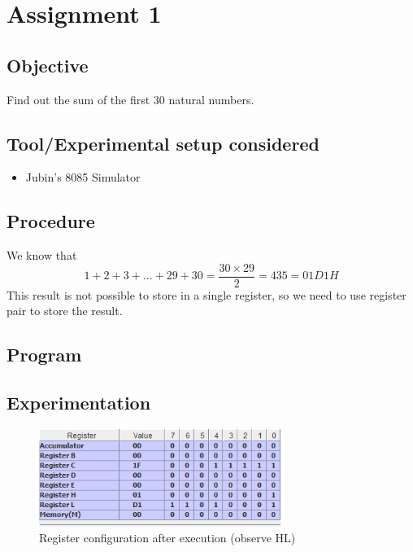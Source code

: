\documentclass[a4paper]{article} %
\begin{document}

\setcounter{tocdepth}{1} %
\tableofcontents
\newpage
{}
\setcounter{page}{1}
\section[Find out the sum of the first 30 natural numbers]{Assignment 1} %
    \subsection{Objective}
        Find out the sum of the first 30 natural numbers.
    \subsection{Tool/Experimental setup considered}
        \begin{itemize}
            \item Jubin's 8085 Simulator
        \end{itemize}
    \subsection{Procedure}
        We know that
        \[1 + 2 + 3 + ... + 29 + 30 = \frac{30 \times 29}{2} = 435 =  01D1H\]
        This result is not possible to store in a single register, so we need to use register pair to store the result.
    \subsection{Program}
        
    \subsection{Experimentation}
        \begin{figure}[h!]
            \centering
            \includegraphics[width=0.7\textwidth]{Assignment 1/1_sum_till_30/registor.png}
            \caption{Register configuration after execution (observe HL)}
            \label{fg1}
        \end{figure}
\end{document}
